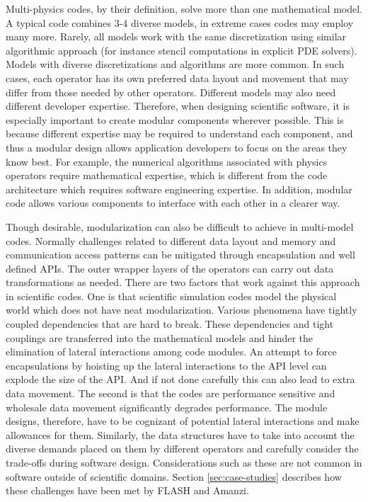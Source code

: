 \label{sec:domain-challenges}
Multi-physics codes, by their definition, solve more than one
mathematical model. A typical code combines 3-4
diverse models, in extreme cases codes may employ many more.
Rarely, all models work with the same
discretization using similar algorithmic approach (for instance
stencil computations in explicit PDE solvers).
Models with diverse discretizations and algorithms are more common. In
such cases, each operator has
its own preferred data layout and movement that may differ
from those needed by other operators. Different models may also need
different developer expertise. Therefore, when designing scientific software,
it is especially important to create  modular components wherever
possible.  This is because different expertise may be required to
understand each component, and thus a modular design allows
application developers to focus on the areas they know best. For
example, the numerical algorithms associated with physics operators
require mathematical expertise, which is different from the code
architecture which requires software engineering expertise. In
addition, modular code allows various components to interface with
each other in a clearer way.  

Though desirable, modularization can also be difficult to achieve in
multi-model codes. Normally challenges related to different data
layout and memory and communication access patterns 
can be mitigated through encapsulation and well defined APIs. The outer
wrapper layers of the operators can carry out data transformations as
needed. There are two factors that work against this approach in scientific
codes. One is that scientific simulation codes model the physical world which does not
have neat modularization. Various phenomena have tightly coupled
dependencies that are hard to break. These dependencies and tight
couplings are transferred into the mathematical models and hinder the
elimination of lateral interactions among code modules. An attempt to
force encapsulations by hoisting up the lateral interactions to the
API level can explode the size of the API. And if not done carefully
this can also lead to extra data movement. The second is that 
the codes are performance sensitive and wholesale data movement
significantly degrades performance. 
The module designs, therefore, have to be cognizant of potential
lateral interactions and make allowances for them. Similarly, the data
structures have to take into account the diverse demands placed on
them by different operators and carefully consider the trade-offs
during software design. Considerations such as these are not common in
software outside of scientific domains.    
Section \ref{sec:case-studies} describes how these challenges have
been met by FLASH and Amanzi.

